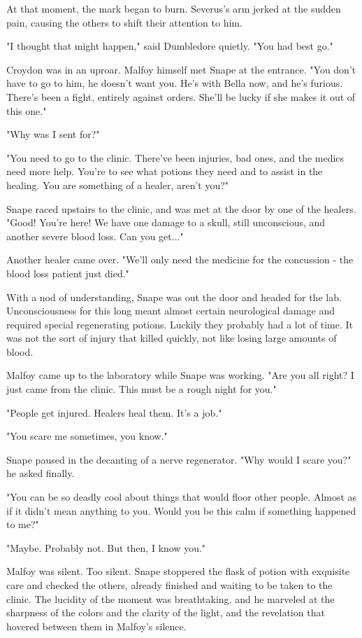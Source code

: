 At that moment, the mark began to burn. Severus's arm jerked at the sudden pain, causing the others to shift their attention to him.

"I thought that might happen," said Dumbledore quietly. "You had best go."

Croydon was in an uproar. Malfoy himself met Snape at the entrance. "You don't have to go to him, he doesn't want you. He's with Bella now, and he's furious. There's been a fight, entirely against orders. She'll be lucky if she makes it out of this one."

"Why was I sent for?"

"You need to go to the clinic. There've been injuries, bad ones, and the medics need more help. You're to see what potions they need and to assist in the healing. You are something of a healer, aren't you?"

Snape raced upstairs to the clinic, and was met at the door by one of the healers. "Good! You're here! We have one damage to a skull, still unconscious, and another severe blood loss. Can you get..."

Another healer came over. "We'll only need the medicine for the concussion - the blood loss patient just died."

With a nod of understanding, Snape was out the door and headed for the lab. Unconsciousness for this long meant almost certain neurological damage and required special regenerating potions. Luckily they probably had a lot of time. It was not the sort of injury that killed quickly, not like losing large amounts of blood.

Malfoy came up to the laboratory while Snape was working. "Are you all right? I just came from the clinic. This must be a rough night for you."

"People get injured. Healers heal them. It's a job."

"You scare me sometimes, you know."

Snape paused in the decanting of a nerve regenerator. "Why would I scare you?" he asked finally.

"You can be so deadly cool about things that would floor other people. Almost as if it didn't mean anything to you. Would you be this calm if something happened to me?"

"Maybe. Probably not. But then, I know you."

Malfoy was silent. Too silent. Snape stoppered the flask of potion with exquisite care and checked the others, already finished and waiting to be taken to the clinic. The lucidity of the moment was breathtaking, and he marveled at the sharpness of the colors and the clarity of the light, and the revelation that hovered between them in Malfoy's silence.

